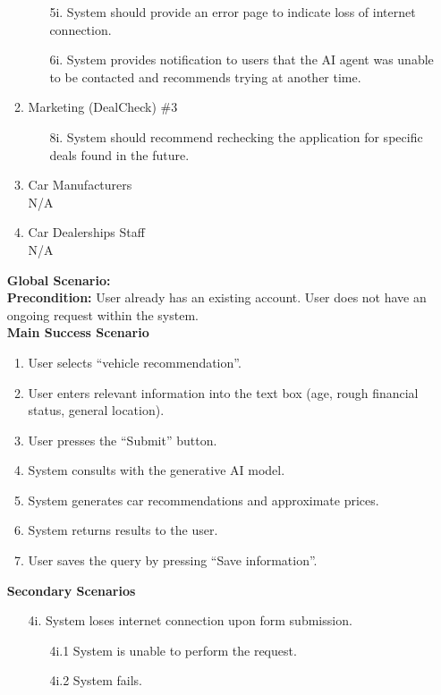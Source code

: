 \documentclass[]{article}
\begin{document}
\begin{enumerate}[{\bf {BE}1.}]
\begin{enumerate}[{\bf VP1.}]
\begin{enumerate}
			  \item[5i.] System should provide an error page to indicate loss of internet connection.
			  \item[6i.] System provides notification to users that the AI agent was unable to be contacted and recommends trying at another time.
			\end{enumerate}
		  \item Marketing (DealCheck) \#3
			\begin{enumerate}
			  \item[8i.] System should recommend rechecking the application for specific deals found in the future.
			\end{enumerate}
		  \item Car Manufacturers \\ N/A
		  \item Car Dealerships Staff \\ N/A
		\end{enumerate}
		{\bf Global Scenario:}\\
		\textbf{Precondition:} User already has an existing account. User does not have an ongoing request within the system.\\
		\textbf{Main Success Scenario}
		\begin{enumerate}[1.]
		  \item User selects ``vehicle recommendation''.
		  \item User enters relevant information into the text box (age, rough financial status, general location).
		  \item User presses the ``Submit'' button.
		  \item System consults with the generative AI model.
		  \item System generates car recommendations and approximate prices.
		  \item System returns results to the user.
		  \item User saves the query by pressing ``Save information''.
		\end{enumerate}
		\textbf{Secondary Scenarios}
		\begin{enumerate}
		  \item[4i.] System loses internet connection upon form submission.
		  \begin{enumerate}
			\item[4i.1] System is unable to perform the request.
			\item[4i.2] System fails.
		  \end{enumerate}

\end{enumerate}
\end{enumerate}
\end{document}
